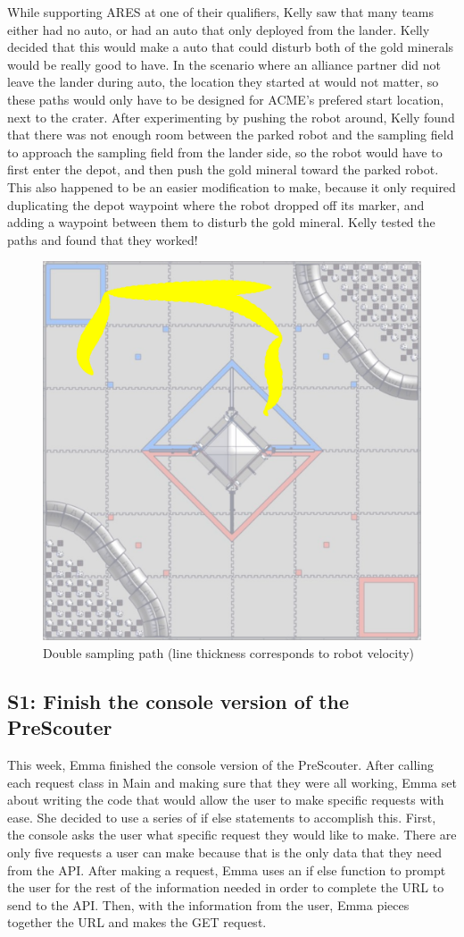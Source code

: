 \documentclass{article}
\begin{document}
While supporting ARES at one of their qualifiers, Kelly saw that many teams either had no auto, or had an auto that only deployed from the lander. Kelly decided that this would make a auto that could disturb both of the gold minerals would be really good to have. In the scenario where an alliance partner did not leave the lander during auto, the location they started at would not matter, so these paths would only have to be designed for ACME's prefered start location, next to the crater. After experimenting by pushing the robot around, Kelly found that there was not enough room between the parked robot and the sampling field to approach the sampling field from the lander side, so the robot would have to first enter the depot, and then push the gold mineral toward the parked robot. This also happened to be an easier modification to make, because it only required duplicating the depot waypoint where the robot dropped off its marker, and adding a waypoint between them to disturb the gold mineral. Kelly tested the paths and found that they worked!

\begin{figure}
    \centering
    \includegraphics[width=.6\textwidth]{22_01-28/double.png}
    \caption{Double sampling path (line thickness corresponds to robot velocity)}
    \label{fig:double}
\end{figure}
\newpage
\subsection{S1: Finish the console version of the PreScouter}

This week, Emma finished the console version of the PreScouter. After calling each request class in Main and making sure that they were all working, Emma set about writing the code that would allow the user to make specific requests with ease. She decided to use a series of if else statements to accomplish this. First, the console asks the user what specific request they would like to make. There are only five requests a user can make because that is the only data that they need from the API. After making a request, Emma uses an if else function to prompt the user for the rest of the information needed in order to complete the URL to send to the API. Then, with the information from the user, Emma pieces together the URL and makes the GET request.\\
\end{document}
